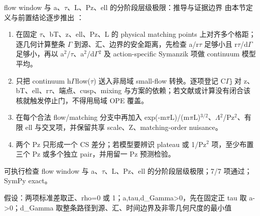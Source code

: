\begin{frame}[t]{flow window 与 a、\ensuremath{\tau}、L、Pz、ell 的分阶段层级极限：推导与证据边界}
\footnotesize
{}\quad 由本节定义与前置结论逐步推出 ：
\begin{enumerate}
\item 在固定 \ensuremath{\tau}、bT、z、ell、Pz、L 的 physical matching points 上对齐多个格距；逐几何计算整条 \ensuremath{\Gamma} 到源、汇、边界的安全距离，先检查 a/\allowbreak{}r\ensuremath{\tau} 足够小且 r\ensuremath{\tau}/\allowbreak{}d\ensuremath{\Gamma} 足够小，再以 a\ensuremath{^{2}}/\allowbreak{}\ensuremath{\tau}、a\ensuremath{^{2}}/\allowbreak{}d\ensuremath{\Gamma}\ensuremath{^{2}} 及 action-specific Symanzik 项做 continuum 模型平均。
\item 只把 continuum h\ensuremath{\Gamma}flow(\ensuremath{\tau}) 送入非局域 small-flow 转换。逐项登记 C\ensuremath{\Gamma}j 对 z、bT、ell、r\ensuremath{\tau}、端点、cusp、mixing 与方案的依赖；若文献或计算没有闭合该核就触发停止门，不得用局域 OPE 覆盖。
\item 在每个合法 flow/\allowbreak{}matching 分支中再加入 exp(-m\ensuremath{\pi}L)/\allowbreak{}(m\ensuremath{\pi}L)\ensuremath{^{3/2}}、\ensuremath{\Lambda}\ensuremath{^{2}}/\allowbreak{}Pz\ensuremath{^{2}}、有限 ell 与交叉项，并保留共享 scale、Z、matching-order nuisance。
\item 两个 Pz 只形成一个 CS 差分；若模型要辨识 plateau 或 1/\allowbreak{}Pz\ensuremath{^{2}} 项，至少布置三个 Pz 或多个独立 pair，并用留一 Pz 预测检验。
\end{enumerate}\begin{block}{可执行检查}
\quad flow window 与 a、\ensuremath{\tau}、L、Pz、ell 的分阶段层级极限；7/7 项通过；SymPy exact。
\par\scriptsize 假设：两项标准差取正、rho=0 或 1；a,tau,d\_Gamma>0，先在固定正 tau 取 a->0；d\_Gamma 取整条路径到源、汇、时间边界及非零几何尺度的最小值
\end{block}
\end{frame}

